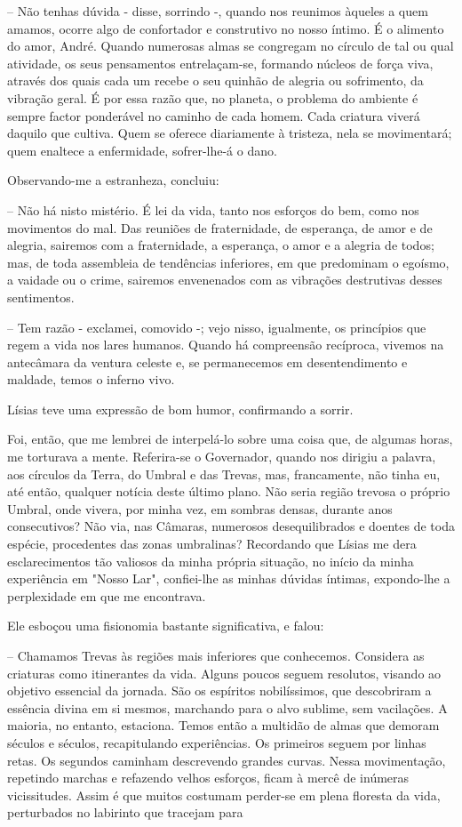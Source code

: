 \documentclass[portuguese,12pt,a4paper]{scrbook}
\begin{document}
	– Não tenhas dúvida - disse, sorrindo -, quando nos reunimos àqueles a quem amamos, ocorre algo de confortador e construtivo no nosso íntimo. É o alimento do amor, André. Quando numerosas almas se congregam no círculo de tal ou qual atividade, os seus pensamentos entrelaçam-se, formando núcleos de força viva, através dos quais cada um recebe o seu quinhão de alegria ou sofrimento, da vibração geral. É por essa razão que, no planeta, o problema do ambiente é sempre factor ponderável no caminho de cada homem. Cada criatura viverá daquilo que cultiva. Quem se oferece diariamente à tristeza, nela se movimentará; quem enaltece a enfermidade, sofrer-lhe-á o dano.
	
	Observando-me a estranheza, concluiu:
	
	– Não há nisto mistério. É lei da vida, tanto nos esforços do bem, como nos movimentos do mal. Das reuniões de fraternidade, de esperança, de amor e de alegria, sairemos com a fraternidade, a esperança, o amor e a alegria de todos; mas, de toda assembleia de tendências inferiores, em que predominam o egoísmo, a vaidade ou o crime, sairemos envenenados com as vibrações destrutivas desses sentimentos.
	
	
	– Tem razão - exclamei, comovido -; vejo nisso, igualmente, os princípios que regem a vida nos lares humanos. Quando há compreensão recíproca, vivemos na antecâmara da ventura celeste e, se permanecemos em desentendimento e maldade, temos o inferno vivo.
	
	Lísias teve uma expressão de bom humor, confirmando a sorrir.
	
	Foi, então, que me lembrei de interpelá-lo sobre uma coisa que, de algumas horas, me torturava a mente. Referira-se o Governador, quando nos dirigiu a palavra, aos círculos da Terra, do Umbral e das Trevas, mas, francamente, não tinha eu, até então, qualquer notícia deste último plano. Não seria região trevosa o próprio Umbral, onde vivera, por minha vez, em sombras densas, durante anos consecutivos? Não via, nas Câmaras, numerosos desequilibrados e doentes de toda espécie, procedentes das zonas umbralinas? Recordando que Lísias me dera esclarecimentos tão valiosos da minha própria situação, no início da minha experiência em "Nosso Lar", confiei-lhe as minhas dúvidas íntimas, expondo-lhe a perplexidade em que me encontrava.
	
	Ele esboçou uma fisionomia bastante significativa, e falou:
	
	– Chamamos Trevas às regiões mais inferiores que conhecemos. Considera as criaturas como itinerantes da vida. Alguns poucos seguem resolutos, visando ao objetivo essencial da jornada. São os espíritos nobilíssimos, que descobriram a essência divina em si mesmos, marchando para o alvo sublime, sem vacilações. A maioria, no entanto, estaciona. Temos então a multidão de almas que demoram séculos e séculos, recapitulando experiências. Os primeiros seguem por linhas retas. Os segundos caminham descrevendo grandes curvas. Nessa movimentação, repetindo marchas e refazendo velhos esforços, ficam à mercê de inúmeras vicissitudes. Assim é que muitos costumam perder-se em plena floresta da vida, perturbados no labirinto que tracejam para
	
\end{document}
